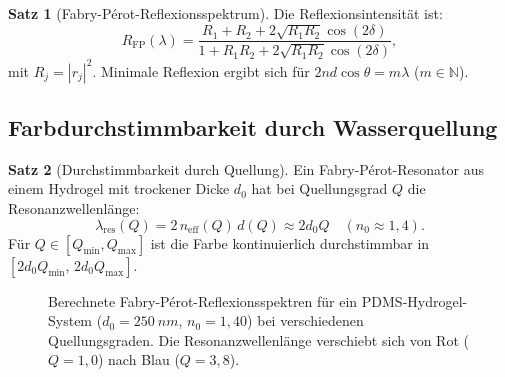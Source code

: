 ﻿\documentclass[a4paper,12pt]{scrreprt}
\theoremstyle{definition}
\newtheorem{satz}{Satz}[section]
\newcommand{\neff}{n_\mathrm{eff}}
\begin{document}
\begin{satz}[Fabry-Pérot-Reflexionsspektrum]
  Die Reflexionsintensität ist:
  \begin{equation}
    R_\mathrm{FP}(\lambda) = \frac{R_1 + R_2 + 2\sqrt{R_1 R_2}\cos(2\delta)}
    {1 + R_1 R_2 + 2\sqrt{R_1 R_2}\cos(2\delta)},
    \label{eq:fp-intensitaet}
  \end{equation}
  mit $R_j = |r_j|^2$. Minimale Reflexion ergibt sich für $2nd\cos\theta = m\lambda$
  ($m \in \mathbb{N}$).
\end{satz}

\subsection{Farbdurchstimmbarkeit durch Wasserquellung}

\begin{satz}[Durchstimmbarkeit durch Quellung]
  Ein Fabry-P{\'e}rot-Resonator aus einem Hydrogel mit trockener Dicke $d_0$
  hat bei Quellungsgrad $Q$ die Resonanzwellenlänge:
  \begin{equation}
    \lambda_\mathrm{res}(Q) = 2\,\neff(Q)\,d(Q) \approx 2d_0 Q \quad (n_0 \approx 1{,}4).
    \label{eq:lambda-quellung}
  \end{equation}
  Für $Q \in [Q_\mathrm{min}, Q_\mathrm{max}]$ ist die Farbe kontinuierlich
  durchstimmbar in $[2d_0 Q_\mathrm{min},\, 2d_0 Q_\mathrm{max}]$.
\end{satz}

\begin{figure}[htb]
  \centering
  \caption{Berechnete Fabry-P{\'e}rot-Reflexionsspektren für ein PDMS-Hydrogel-System
    ($d_0 = \SI{250}{nm}$, $n_0 = 1{,}40$) bei verschiedenen Quellungsgraden.
    Die Resonanzwellenlänge verschiebt sich von Rot ($Q=1{,}0$) nach Blau ($Q=3{,}8$).}
  \label{fig:fp-spektren}
\end{figure}
\end{document}
